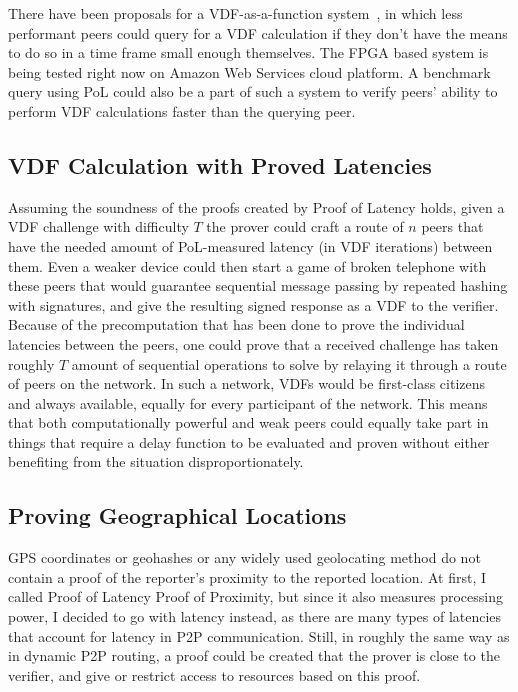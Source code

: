 There have been proposals for a VDF-as-a-function system~\cite{Devlin2020-qw}, in which less performant peers could query for a VDF calculation if they don't have the means to do so in a time frame small enough themselves. The FPGA based system is being tested right now on Amazon Web Services cloud platform. A benchmark query using PoL could also be a part of such a system to verify peers' ability to perform VDF calculations faster than the querying peer.

\subsection{VDF Calculation with Proved Latencies}
Assuming the soundness of the proofs created by Proof of Latency holds, given a VDF challenge with difficulty \(T\) the prover could craft a route of \(n\) peers that have the needed amount of PoL-measured latency (in VDF iterations) between them. Even a weaker device could then start a game of broken telephone with these peers that would guarantee sequential message passing by repeated hashing with signatures, and give the resulting signed response as a VDF to the verifier. Because of the precomputation that has been done to prove the individual latencies between the peers, one could prove that a received challenge has taken roughly \(T\) amount of sequential operations to solve by relaying it through a route of peers on the network. In such a network, VDFs would be first-class citizens and always available, equally for every participant of the network. This means that both computationally powerful and weak peers could equally take part in things that require a delay function to be evaluated and proven without either benefiting from the situation disproportionately.

\subsection{Proving Geographical Locations}
GPS coordinates or geohashes or any widely used geolocating method do not contain a proof of the reporter's proximity to the reported location. At first, I called Proof of Latency Proof of Proximity, but since it also measures processing power, I decided to go with latency instead, as there are many types of latencies that account for latency in P2P communication. Still, in roughly the same way as in dynamic P2P routing, a proof could be created that the prover is close to the verifier, and give or restrict access to resources based on this proof.

